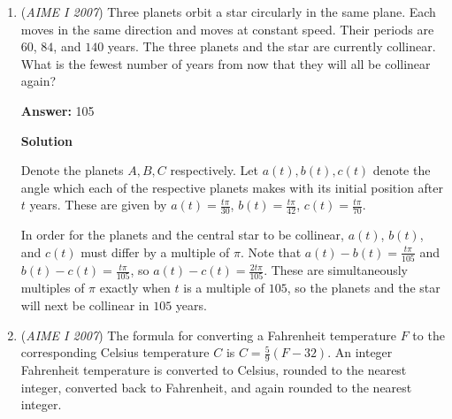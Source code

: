 \begin{enumerate}
 Now, by DeMoivre's we have z\textasciicircum{}3 = r\textasciicircum{}3(cos(3*theta) + isin(2*theta)). sin(3*theta) = 3sin(theta) - 4sin\textasciicircum{}3(theta). Hence, we have the imaginary part as z\textasciicircum{}3 as r\textasciicircum{}3 * (3 * b/r - 4 * (b/r)\textasciicircum{}3) = 3br\textasciicircum{}2 - 4b. 

 Finally, setting 18b = 3b(√(81 + b\textasciicircum{}2)\textasciicircum{}2) - 4b\textasciicircum{}3, we get:

 18b = 243b + 3b\textasciicircum{}3 - 4b\textasciicircum{}3, or b\textasciicircum{}3 = 225b, or b = +- 15 or 0. 

 However, the problem specifies that b is a positive real number, so b can only be $\boxed{015}$.

 


	\item (\textit{AIME I 2007}) Three planets orbit a star circularly in the same plane.  Each moves in the same direction and moves at constant speed.  Their periods are $60$, $84$, and $140$ years.  The three planets and the star are currently collinear.  What is the fewest number of years from now that they will all be collinear again?


 
 \textbf{Answer: }105



\textbf{Solution}

Denote the planets $A, B, C$ respectively.  Let $a(t), b(t), c(t)$ denote the angle which each of the respective planets makes with its initial position after $t$ years.  These are given by $a(t) = \frac{t \pi}{30}$, $b(t) = \frac{t \pi}{42}$, $c(t) = \frac{t \pi}{70}$.

 In order for the planets and the central star to be collinear, $a(t)$, $b(t)$, and $c(t)$ must differ by a multiple of $\pi$.  Note that $a(t) - b(t) = \frac{t \pi}{105}$ and $b(t) - c(t) = \frac{t \pi}{105}$, so $a(t) - c(t) = \frac{ 2 t \pi}{105}$.  These are simultaneously multiples of $\pi$ exactly when $t$ is a multiple of $105$, so the planets and the star will next be collinear in $\boxed{105}$ years.

 


	\item (\textit{AIME I 2007}) The formula for converting a Fahrenheit temperature $F$ to the corresponding Celsius temperature $C$ is $C = \frac{5}{9}(F-32).$  An integer Fahrenheit temperature is converted to Celsius, rounded to the nearest integer, converted back to Fahrenheit, and again rounded to the nearest integer.



\end{enumerate}
